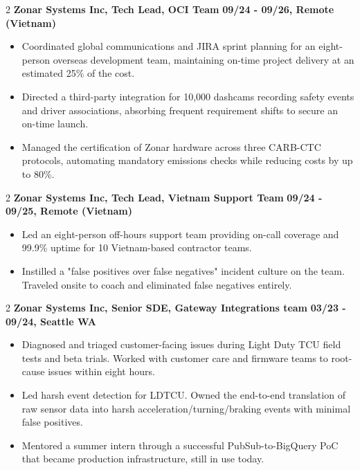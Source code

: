 \documentclass[]{article}
\begin{document}
    \begin{paracol}{2}
    \textbf{Zonar Systems Inc, Tech Lead, OCI Team}
    \switchcolumn
    \textbf{09/24 - 09/26, Remote (Vietnam)}
    \end{paracol}
    \begin{itemize}
        \item Coordinated global communications and JIRA sprint planning for an eight-person overseas development team, maintaining on-time project delivery at an estimated 25\% of the cost.
        \item Directed a third-party integration for 10,000 dashcams recording safety events and driver associations, absorbing frequent requirement shifts to secure an on-time launch.
        \item Managed the certification of Zonar hardware across three CARB-CTC protocols, automating mandatory emissions checks while reducing costs by up to 80\%.
    \end{itemize}
    \smallskip

    \begin{paracol}{2}
    \textbf{Zonar Systems Inc, Tech Lead, Vietnam Support Team}
    \switchcolumn
    \textbf{09/24 - 09/25, Remote (Vietnam)}
    \end{paracol}
    \begin{itemize}
         \item Led an eight-person off-hours support team providing on-call coverage and 99.9\% uptime for 10 Vietnam-based contractor teams.
         \item Instilled a "false positives over false negatives" incident culture on the team. Traveled onsite to coach and eliminated false negatives entirely.
    \end{itemize}
    \smallskip

    \begin{paracol}{2}
    \textbf{Zonar Systems Inc, Senior SDE, Gateway Integrations team}
    \switchcolumn
    \textbf{03/23 - 09/24, Seattle WA}
    \end{paracol}
    \begin{itemize}
        \item Diagnosed and triaged customer-facing issues during Light Duty TCU field tests and beta trials. Worked with customer care and firmware teams to root-cause issues within eight hours.
        \item Led harsh event detection for LDTCU. Owned the end-to-end translation of raw sensor data into harsh acceleration/turning/braking events with minimal false positives.
        \item Mentored a summer intern through a successful PubSub-to-BigQuery PoC that became production infrastructure, still in use today.
    \end{itemize}
    \smallskip
\end{document}
